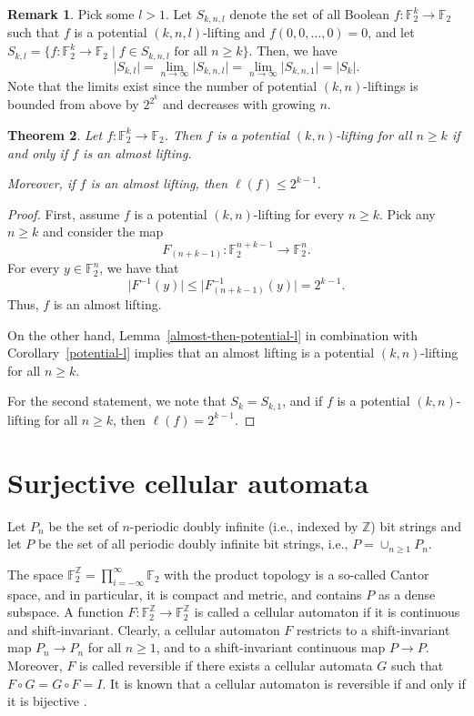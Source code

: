 \documentclass[11pt,english,a4paper]{amsart}
\theoremstyle{plain}
\newtheorem{theorem}{Theorem}[section]
\theoremstyle{definition}
\newtheorem{remark}[theorem]{Remark}
\theoremstyle{remark}
\newcommand{\Z}{\mathbb{Z}}
\newcommand{\F}{\mathbb{F}}
\begin{document}
	\begin{remark}
		Pick some $l>1$.
		Let $S_{k, n, l}$ denote the set of all Boolean $f\colon \F_2^k\to\F_2$ such that $f$ is a potential $(k, n, l)$-lifting and $f(0, 0, \dotsc , 0) = 0$,
		and let $S_{k,l} = \{ f\colon \F_2^k\to\F_2 \mid f \in S_{k, n, l} \text{ for all } n\geq k\}$. Then, we have
		\[
		\lvert S_{k, l} \rvert =
		\lim_{n \rightarrow \infty} \lvert S_{k, n, l} \rvert =
		\lim_{n \rightarrow \infty} \lvert S_{k, n, 1} \rvert =
		\lvert S_k \rvert.
		\]
		Note that the limits exist since the number of potential $(k,n)$-liftings is bounded from above by $2^{2^k}$ and decreases with growing $n$.
	\end{remark}
	
	\begin{theorem}\label{main-theorem}
		Let $f\colon \F_2^k\to\F_2$.
		Then $f$ is a potential $(k,n)$-lifting for all $n\geq k$ if and only if $f$ is an almost lifting.
		
		Moreover, if $f$ is an almost lifting, then $\ell(f)\leq 2^{k-1}$.
	\end{theorem}
	
	\begin{proof}
		First, assume $f$ is a potential $(k,n)$-lifting for every $n\geq k$.
        Pick any $n\geq k$ and consider the map
		\[
		F_{(n+k-1)}\colon \F_2^{n+k-1} \to \F_2^n.
		\]
		For every $y\in\F_2^n$, we have that
		\[
		\lvert F^{-1}(y)\rvert \leq \lvert F_{(n+k-1)}^{-1}(y)\rvert = 2^{k-1}.
		\]
		Thus, $f$ is an almost lifting.
		
		On the other hand, Lemma~\ref{almost-then-potential-l} in combination with Corollary~\ref{potential-l} implies that an almost lifting is a potential $(k, n)$-lifting for all $n \geq k$.
		
		For the second statement, we note that $S_k=S_{k,1}$, and if $f$ is a potential $(k,n)$-lifting for all $n\geq k$, then $\ell(f)=2^{k-1}$.
	\end{proof}
	
	
	\section{Surjective cellular automata}
	
	Let $P_n$ be the set of $n$-periodic doubly infinite (i.e., indexed by $\Z$) bit strings and let $P$ be the set of all periodic doubly infinite bit strings, i.e., $P=\cup_{n\geq 1}P_n$.

    The space $\F_2^\Z=\prod_{i=-\infty}^{\infty}\F_2$ with the product topology is a so-called Cantor space, and in particular, it is compact and metric, and contains $P$ as a dense subspace. A function $F\colon\F_2^\Z\to\F_2^\Z$ is called a cellular automaton if it is continuous and shift-invariant. Clearly, a cellular automaton $F$ restricts to a shift-invariant map $P_n\to P_n$ for all $n\geq 1$, and to a shift-invariant continuous map $P\to P$. Moreover, $F$ is called reversible if there exists a cellular automata $G$ such that $F\circ G=G\circ F=I$. It is known that a cellular automaton is reversible if and only if it is bijective \cite{hedlund}.
	
\end{document}
